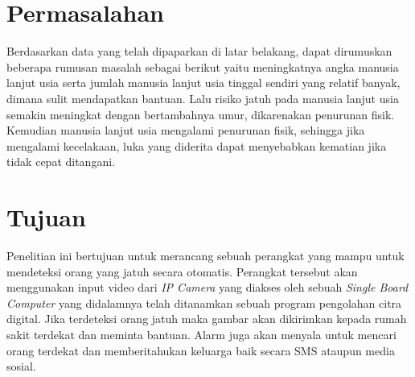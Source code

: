 \section{Permasalahan}
\vspace{1ex}

Berdasarkan data yang telah dipaparkan di latar belakang, dapat dirumuskan beberapa rumusan masalah sebagai berikut yaitu meningkatnya angka manusia lanjut usia serta jumlah manusia lanjut usia tinggal sendiri yang relatif banyak, dimana sulit mendapatkan bantuan. Lalu risiko jatuh pada manusia lanjut usia semakin meningkat dengan bertambahnya umur, dikarenakan penurunan fisik. Kemudian manusia lanjut usia mengalami  penurunan  fisik, sehingga  jika  mengalami  kecelakaan,  luka  yang diderita dapat menyebabkan kematian jika tidak cepat ditangani.
\vspace{1ex}

\section{Tujuan}
\vspace{1ex}

Penelitian ini bertujuan untuk merancang sebuah perangkat yang mampu untuk mendeteksi orang yang jatuh secara otomatis. Perangkat tersebut akan menggunakan input video dari \textit{IP Camera} yang diakses oleh sebuah \textit{Single Board Computer} yang didalamnya telah ditanamkan sebuah program pengolahan citra digital. Jika terdeteksi orang jatuh maka gambar akan dikirimkan kepada rumah sakit terdekat dan meminta bantuan. Alarm juga akan menyala untuk mencari orang terdekat dan memberitahukan keluarga baik secara SMS ataupun media sosial.
\vspace{1ex}

